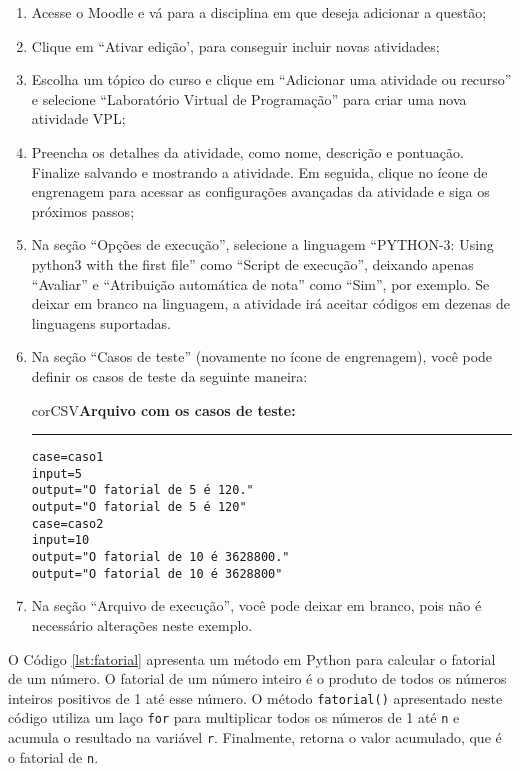 \begin{enumerate}
    \item Acesse o Moodle e vá para a disciplina em que deseja adicionar a questão;
  
    \item Clique em ``Ativar edição', para conseguir incluir novas atividades;
  
    \item Escolha um tópico do curso e clique em ``Adicionar uma atividade ou recurso'' e selecione ``Laboratório Virtual de Programação''  para criar uma nova atividade VPL;

    \item Preencha os detalhes da atividade, como nome, descrição e pontuação. Finalize salvando e mostrando a atividade. Em seguida, clique no ícone de engrenagem para acessar as configurações avançadas da atividade e siga os próximos passos;

    \item Na seção ``Opções de execução'', selecione a linguagem ``PYTHON-3: Using python3 with the first file'' como ``Script de execução'', deixando apenas ``Avaliar'' e ``Atribuição automática de nota'' como ``Sim'', por exemplo. Se deixar em branco na linguagem, a atividade irá aceitar códigos em dezenas de linguagens suportadas.

    \item Na seção ``Casos de teste'' (novamente no ícone de engrenagem), você pode definir os casos de teste da seguinte maneira:

\begin{myboxCode}{corCSV}{\textbf{Arquivo com os casos de teste:}}\vspace{3mm}
\hrule
\begin{verbatim}
case=caso1
input=5
output="O fatorial de 5 é 120."
output="O fatorial de 5 é 120"
case=caso2
input=10
output="O fatorial de 10 é 3628800."
output="O fatorial de 10 é 3628800"
\end{verbatim}
\end{myboxCode}

    \item Na seção ``Arquivo de execução'', você pode deixar em branco, pois não é necessário alterações neste exemplo.

\end{enumerate}

O Código \ref{lst:fatorial} apresenta um método em Python para calcular o fatorial de um número. O fatorial de um número inteiro é o produto de todos os números inteiros positivos de 1 até esse número.
%
O método \verb|fatorial()| apresentado neste código utiliza um laço \verb|for| para multiplicar todos os números de 1 até \verb|n| e acumula o resultado na variável \verb|r|. Finalmente, retorna o valor acumulado, que é o fatorial de \verb|n|.

